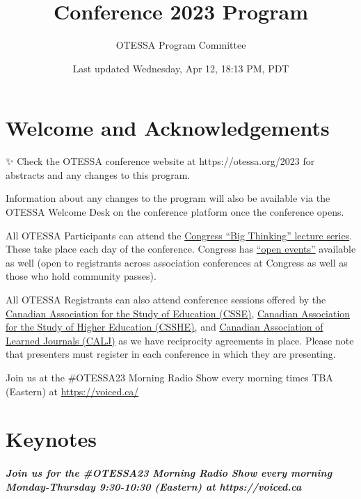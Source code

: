 \documentclass[
]{book}
\title{Conference 2023 Program}
\author{OTESSA Program Committee}
\date{Last updated Wednesday, Apr 12, 18:13 PM, PDT}
\begin{document}
\maketitle

{
\setcounter{tocdepth}{1}
\tableofcontents
}
\hypertarget{welcome-and-acknowledgements}{%
\chapter*{Welcome and Acknowledgements}\label{welcome-and-acknowledgements}}

\begin{protip}
✨ Check the OTESSA conference website at https://otessa.org/2023 for
abstracts and any changes to this program.

Information about any changes to the program will also be available via
the OTESSA Welcome Desk on the conference platform once the conference
opens.
\end{protip}

All OTESSA Participants can attend the \href{https://www.federationhss.ca/en/congress/congress-2022/open-programming}{Congress ``Big Thinking'' lecture series}. These take place each day of the conference. Congress has \href{https://www.federationhss.ca/en/congress/congress-2022/calendar-open-events}{``open events''} available as well (open to registrants across association conferences at Congress as well as those who hold community passes).

All OTESSA Registrants can also attend conference sessions offered by the \href{https://csse-scee.ca/}{Canadian Association for the Study of Education (CSSE)}, \href{https://csshe-scees.ca/}{Canadian Association for the Study of Higher Education (CSSHE)}, and \href{https://www.calj-acrs.ca/}{Canadian Association of Learned Journals (CALJ)} as we have reciprocity agreements in place. Please note that presenters must register in each conference in which they are presenting.

Join us at the \#OTESSA23 Morning Radio Show every morning times TBA (Eastern) at \url{https://voiced.ca/}

\hypertarget{keynotes}{%
\chapter*{Keynotes}\label{keynotes}}

\begin{protip}
\hypertarget{join-us-for-the-otessa23-morning-radio-show-every-morning-monday-thursday-930-1030-eastern-at-httpsvoiced.ca}{%
\paragraph{Join us for the \#OTESSA23 Morning Radio Show every morning
Monday-Thursday 9:30-10:30 (Eastern) at
https://voiced.ca}\label{join-us-for-the-otessa23-morning-radio-show-every-morning-monday-thursday-930-1030-eastern-at-httpsvoiced.ca}}
\end{protip}
\end{document}
